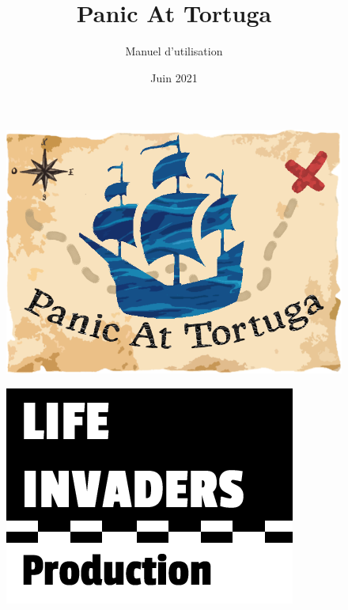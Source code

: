 \documentclass[12pt,french]{article}
\title{\fontfamily{phv}\selectfont \Huge \textbf{Panic At Tortuga}}
\author{\fontfamily{phv}\Huge{Manuel d'utilisation}}
\date{\fontfamily{phv}\selectfont Juin 2021}
\begin{document}
\begin{titlepage}
    \maketitle
    
    \thispagestyle{empty}
    \vspace{10pt}
    \begin{figure}[hbt!]
        \centering
        \includegraphics[scale=0.4]{logo.png}
    \end{figure}
    \vspace{10pt}

    \begin{figure}[hbt!]
        \centering
        \includegraphics[scale=0.8]{logo_lifeinvaders_copie.png}
    \end{figure}
\end{titlepage}
\end{document}
